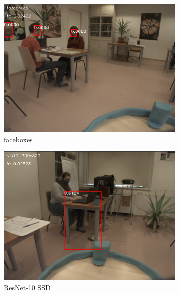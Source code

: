 \begin{figure}
    \centering
    \begin{subfigure}[b]{0.3\linewidth}
        \includegraphics[width=\linewidth]{figures/video_comparison/false_positives/video_comparison_faceboxes_false_positive.png}
        \caption{faceboxes}
    \end{subfigure}
    \begin{subfigure}[b]{0.3\linewidth}
        \includegraphics[width=\linewidth]{figures/video_comparison/false_positives/video_comparison_resnet_false_positive.png}
        \caption{ResNet-10 SSD}
    \end{subfigure}
    \begin{subfigure}[b]{0.3\linewidth}

\end{subfigure}
\end{figure}
